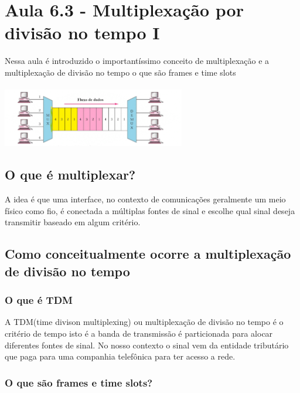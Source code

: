 
\section{Aula 6.3 - Multiplexação por divisão no tempo I}

Nessa aula é introduzido o importantíssimo conceito de multiplexação e a multiplexação de divisão no tempo o que são frames e time slots
\\\\
\includegraphics[width=0.6\textwidth]{../assets/muxte.png}\cite{dc}

\subsection{O que é multiplexar?}

A idea é que uma interface, no contexto de comunicações geralmente um meio físico como fio, é conectada a múltiplas fontes de sinal e escolhe qual sinal deseja transmitir
baseado em algum critério.


\subsection{Como conceitualmente ocorre a multiplexação de divisão no tempo}

\subsubsection{O que é TDM}
A TDM(time divison multiplexing) ou multiplexação de divisão no tempo é o critério de tempo isto é a banda de transmissão é particionada para alocar diferentes fontes de sinal.
No nosso contexto o sinal vem da entidade tributário que paga para uma companhia telefônica para ter acesso a rede.

\subsubsection{O que são frames e time slots?}

